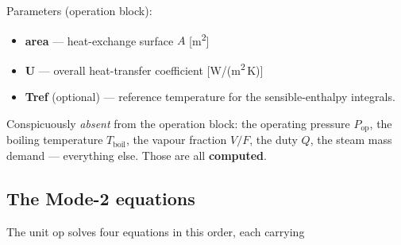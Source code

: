 \documentclass[11pt,a4paper]{article}
\begin{document}
Parameters (operation block):
\begin{itemize}[leftmargin=*,nosep,topsep=2pt]
  \item \textbf{area} --- heat-exchange surface $A$ [m\textsuperscript{2}]
  \item \textbf{U} --- overall heat-transfer coefficient [W/(m\textsuperscript{2}\,K)]
  \item \textbf{Tref} (optional) --- reference temperature for the
        sensible-enthalpy integrals.
\end{itemize}

\noindent Conspicuously \emph{absent} from the operation block: the
operating pressure $P_{\!\text{op}}$, the boiling temperature
$T_{\!\text{boil}}$, the vapour fraction $V/F$, the duty $Q$, the
steam mass demand --- everything else.  Those are all
\textbf{computed}.

\subsection{The Mode-2 equations}

The unit op solves four equations in this order, each carrying
\end{document}
